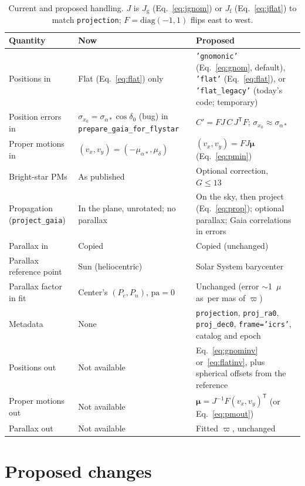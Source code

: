 \documentclass[11pt]{article}
\newcommand{\code}[1]{\texttt{#1}}
\newcommand{\muas}{$\mu$as}
\begin{document}
\begin{table}[H]
\centering
\small
\caption{Current and proposed handling. $J$ is $J_\mathrm{g}$
(Eq.~\ref{eq:jgnom}) or $J_\mathrm{f}$ (Eq.~\ref{eq:jflat}) to match
\code{projection}; $F = \mathrm{diag}(-1,1)$ flips east to west.}
\label{tab:summary}
\begin{tabularx}{\textwidth}{@{}l>{\raggedright\arraybackslash}X>{\raggedright\arraybackslash}X@{}}
\toprule
Quantity & Now & Proposed \\
\midrule
Positions in & Flat (Eq.~\ref{eq:flat}) only &
  \code{'gnomonic'} (Eq.~\ref{eq:gnom}, default), \code{'flat'} (Eq.~\ref{eq:flat}), or \code{'flat\_legacy'} (today's code; temporary) \\
Position errors in & $\sigma_{x_0} = \sigma_{\alpha*}\cos\delta_0$ (bug) in \code{prepare\_gaia\_for\_flystar} &
  $C' = FJ\,C\,J^{\mathsf T}F$; $\sigma_{x_0} \approx \sigma_{\alpha*}$ \\
Proper motions in & $(v_x,v_y) = (-\mu_{\alpha*}, \mu_\delta)$ &
  $(v_x,v_y) = FJ\boldsymbol\mu$ (Eq.~\ref{eq:pmin}) \\
Bright-star PMs & As published & Optional \citet{CantatGaudin2021} correction, $G \le 13$ \\
Propagation (\code{project\_gaia}) & In the plane, unrotated; no parallax &
  On the sky, then project (Eq.~\ref{eq:prop}); optional parallax; Gaia correlations in errors \\
Parallax in & Copied & Copied (unchanged) \\
Parallax reference point & Sun (heliocentric) & Solar System barycenter \\
Parallax factor in fit & Center's $(P_e,P_n)$, $\mathrm{pa}=0$ &
  Unchanged (error $\sim$1~\muas\ per mas of $\varpi$) \\
Metadata & None &
  \code{projection}, \code{proj\_ra0}, \code{proj\_dec0}, \code{frame='icrs'}, catalog and epoch \\
Positions out & Not available & Eq.~\ref{eq:gnominv} or~\ref{eq:flatinv}, plus spherical offsets from the reference \\
Proper motions out & Not available & $\boldsymbol\mu = J^{-1}F(v_x,v_y)^{\mathsf T}$ (or Eq.~\ref{eq:pmout}) \\
Parallax out & Not available & Fitted $\varpi$, unchanged \\
\bottomrule
\end{tabularx}
\end{table}

\section{Proposed changes}
\label{sec:proposal}
\end{document}
